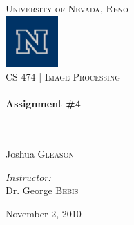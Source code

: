 \begin{titlepage}
\begin{center}

\textsc{\LARGE University of Nevada, Reno}\\[.5cm]
\includegraphics[width=0.15\textwidth]{./logo.png}\\[.5cm]

\textsc{\large CS 474 | Image Processing } \\[.5cm]

\HRule \\[0.4cm]
{ \huge \bfseries Assignment \#4}\\[0.4cm]

\HRule \\[1.5cm]

\begin{minipage}{0.4\textwidth}
\begin{flushleft} \large
\emph{}\\
    Joshua \textsc{Gleason}\\
    \end{flushleft}
    \end{minipage}
    \begin{minipage}{0.4\textwidth}
    \begin{flushright} \large
    \emph{Instructor:} \\
      Dr. George \textsc{Bebis}
      \end{flushright}
      \end{minipage}

      \vspace*{\fill}

      

      \vspace*{\fill}

{\large November 2, 2010}

\end{center}

\end{titlepage}

